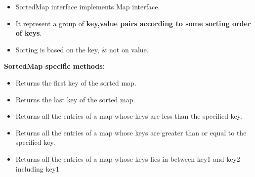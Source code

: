 \setlength{\columnsep}{3pt}
\begin{flushleft}
	
	\begin{itemize}
		\item SortedMap interface implements Map interface.
		\item It represent a group of \textbf{key,value pairs according to some sorting order of keys}.
		\item Sorting is based on the key, \& not on value.
		
	\end{itemize}
	
	\textbf{SortedMap specific methods:}
	\begin{itemize}
		\item Returns the first key of the sorted map.
		\bigskip
		\item Returns the last key of the sorted map.
		\bigskip
		\item Returns all the entries of a map whose keys are less than the specified key.
		\bigskip
		\item Returns all the entries of a map whose keys are greater than or equal to the specified key.
		\bigskip
		\item Returns all the entries of a map whose keys lies in between key1 and key2 including key1	
	\end{itemize}
\end{flushleft}
\newpage
